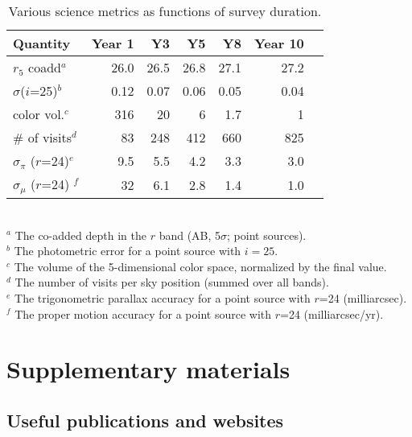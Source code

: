 \documentclass[DM,lsstdraft,toc,usenatbib]{lsstdoc}
\begin{document}
\begin{table}
\caption{Various science metrics as functions of survey duration.}
\begin{tabular}{|l|r|r|r|r|r|r|}
\hline     
          Quantity                          &     Year 1   &    Y3  &     Y5  &     Y8   &     Year 10   \\
\hline  
    $r_5$ coadd$^a$                   &       26.0    &      26.5   &      26.8    &      27.1    &          27.2     \\
    $\sigma$($i$=25)$^b$         &     0.12    &     0.07    &      0.06    &    0.05      &        0.04        \\     
    color vol.$^c$                        &       316     &       20     &        6      &    1.7        &           1       \\
     \# of visits$^d$                    &          83     &     248     &      412     &    660      &          825      \\  
    $\sigma_\pi$ ($r$=24)$^e$   &        9.5     &      5.5     &        4.2    &     3.3       &          3.0      \\ 
    $\sigma_\mu$ ($r$=24) $^f$  &  32   &      6.1    &     2.8   &     1.4   &     1.0     \\
\hline                         
\end{tabular}
\\ \vskip 0.05in
$^a$ The co-added depth in the $r$ band (AB, 5$\sigma$; point sources).  \\
$^b$ The photometric error for a point source with $i=25$. \\
$^c$ The volume of the 5-dimensional color space, normalized by the final value. \\
$^d$ The number of visits per sky position (summed over all bands). \\
$^e$ The trigonometric parallax accuracy for a point source with $r$=24 (milliarcsec). \\ 
$^f$  The proper motion accuracy for a point source with $r$=24 (milliarcsec/yr).  \\
\end{table}



\section{Supplementary materials} 
\label{append:supplemental}

\subsection{Useful publications and websites \label{sec:pubs}}
\end{document}
